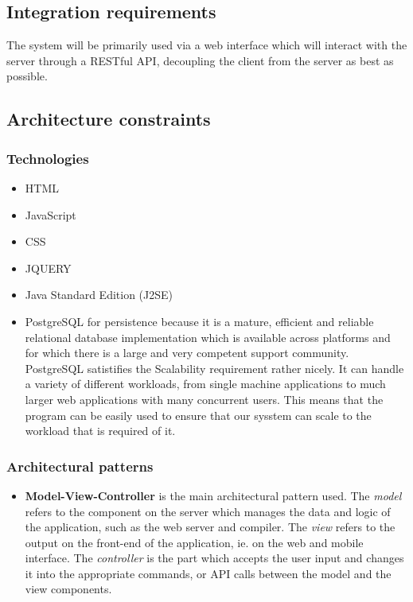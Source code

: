 \documentclass[english]{article}
\begin{document}
			
		\subsection{Integration requirements}
			\par The system will be primarily used via a web interface which will interact with the server through a RESTful API, decoupling the client from the server as best as possible.
			
		\setcounter{secnumdepth}{5}
		\subsection{Architecture constraints}
			\subsubsection{Technologies}
			\begin{itemize}
		  \item HTML
		  \item JavaScript
		  \item CSS
		  \item JQUERY
		  \item Java Standard Edition (J2SE)
		  \item PostgreSQL for persistence because it is a mature, efficient and reliable relational database
          implementation which is available across platforms and for which there is a large and very competent
          support community.\\ 
         \newline
          PostgreSQL satistiﬁes the Scalability requirement rather nicely. It can handle a variety of diﬀerent workloads, from single machine applications to much larger web applications with many concurrent users. This means that the program can be easily used to ensure that our sysstem can scale to the workload that is required of it. 
       \end{itemize}
       
		\subsubsection{Architectural patterns} %
		\begin{itemize}
			\item \textbf{Model-View-Controller} is the main architectural pattern used. The \textit{model} refers to the component on the server which manages the data and logic of the application, such as the web server and compiler. The \textit{view} refers to the output on the front-end of the application, ie. on the web and mobile interface. The \textit{controller} is the part which accepts the user input and changes it into the appropriate commands, or API calls between the model and the view components.
		\end{itemize}
		
\end{document}
